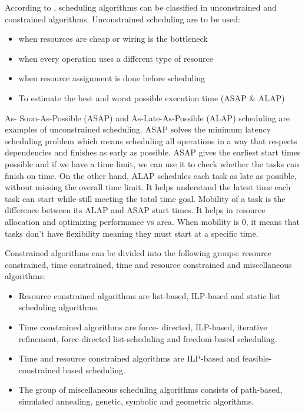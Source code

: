 \documentclass[conference]{IEEEtran}
\begin{document}
According to \cite{Saraju01}, scheduling algorithms can be classified in unconstrained and constrained algorithms. Unconstrained scheduling are to be used: 
\begin{itemize}
    \item when resources are cheap or wiring is the bottleneck
    \item when every operation uses a different type of resource
    \item when resource assignment is done before scheduling
    \item To estimate the best and worst possible execution time (ASAP \& ALAP)
    
\end{itemize}
As- Soon-As-Possible (ASAP) and As-Late-As-Possible (ALAP) scheduling are examples of unconstrained scheduling. ASAP solves the minimum latency scheduling problem which means scheduling all operations in a way that respects dependencies and finishes as early as possible. ASAP gives the earliest start times possible and if we have a time limit, we can use it to check whether the tasks can finish on time. On the other hand, ALAP schedules each task as late as possible, without missing the overall time limit. It helps understand the latest time each task can start while still meeting the total time goal. Mobility of a task is the difference between its ALAP and ASAP start times. It helps in resource allocation and optimizing performance vs area. When mobility is 0, it means that tasks don't have flexibility meaning they must start at a specific time. 


Constrained algorithms can be divided into the following groups: resource constrained, time constrained, time and resource constrained and miscellaneous algorithms:
\begin{itemize}
    \item Resource constrained algorithms are list-based, ILP-based and static list scheduling algorithms.
    \item Time constrained algorithms are force- directed, ILP-based, iterative refinement, force-directed list-scheduling and freedom-based scheduling.
    \item Time and resource constrained algorithms are ILP-based and feasible-constrained based scheduling.
    \item The group of miscellaneous scheduling algorithms consists of path-based, simulated annealing, genetic, symbolic and geometric algorithms. 
\end{itemize}   
\end{document}

